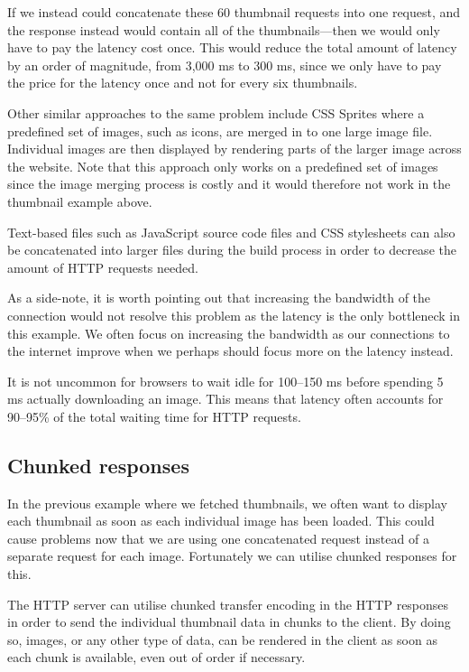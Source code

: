 \documentclass{cslthse-msc}
\begin{document}
If we instead could concatenate these 60 thumbnail requests into one request, and the response instead would contain all of the thumbnails---then we would only have to pay the latency cost once. This would reduce the total amount of latency by an order of magnitude, from 3,000 ms to 300 ms, since we only have to pay the price for the latency once and not for every six thumbnails.

Other similar approaches to the same problem include CSS Sprites\cite{css_sprites} where a predefined set of images, such as icons, are merged in to one large image file. Individual images are then displayed by rendering parts of the larger image across the website. Note that this approach only works on a predefined set of images since the image merging process is costly and it would therefore not work in the thumbnail example above.

Text-based files such as JavaScript source code files and CSS stylesheets can also be concatenated into larger files during the build process in order to decrease the amount of HTTP requests needed\cite{js_concat}.

As a side-note, it is worth pointing out that increasing the bandwidth of the connection would not resolve this problem as the latency is the only bottleneck in this example. We often focus on increasing the bandwidth as our connections to the internet improve when we perhaps should focus more on the latency instead.

It is not uncommon for browsers to wait idle for 100--150 ms before spending 5 ms actually downloading an image. This means that latency often accounts for 90--95\% of the total waiting time for HTTP requests\cite{latency}. 

\subsection{Chunked responses}
In the previous example where we fetched thumbnails, we often want to display each thumbnail as soon as each individual image has been loaded. This could cause problems now that we are using one concatenated request instead of a separate request for each image. Fortunately we can utilise chunked responses for this.

The HTTP server can utilise chunked transfer encoding in the HTTP responses in order to send the individual thumbnail data in chunks\cite{chunked} to the client. By doing so, images, or any other type of data, can be rendered in the client as soon as each chunk is available, even out of order if necessary. 
\end{document}
